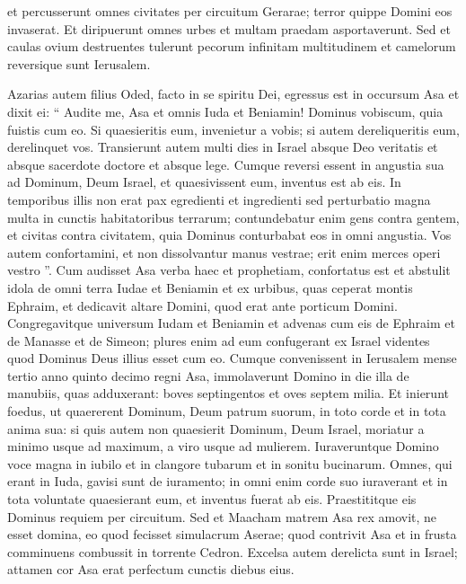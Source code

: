 \begin{biblechapter}
\begin{biblechapter}
\begin{biblechapter}
\begin{biblechapter}
\begin{biblechapter}
\begin{biblechapter}
\begin{biblechapter}
\begin{biblechapter}
\begin{biblechapter}
\begin{biblechapter}
\begin{biblechapter}
\begin{biblechapter}
\begin{biblechapter}
\begin{biblechapter}
\verse et percusserunt omnes civitates per circuitum Gerarae; terror quippe Domini eos invaserat. Et diripuerunt omnes urbes et multam praedam asportaverunt. 
\verse Sed et caulas ovium destruentes tulerunt pecorum infinitam multitudinem et camelorum reversique sunt Ierusalem.
 
\begin{biblechapter}
\verse Azarias autem filius Oded, facto in se spiritu Dei, 
\verse egressus est in occursum Asa et dixit ei: “ Audite me, Asa et omnis Iuda et Beniamin! Dominus vobiscum, quia fuistis cum eo. Si quaesieritis eum, invenietur a vobis; si autem dereliqueritis eum, derelinquet vos. 
\verse Transierunt autem multi dies in Israel absque Deo veritatis et absque sacerdote doctore et absque lege. 
\verse Cumque reversi essent in angustia sua ad Dominum, Deum Israel, et quaesivissent eum, inventus est ab eis. 
\verse In temporibus illis non erat pax egredienti et ingredienti sed perturbatio magna multa in cunctis habitatoribus terrarum; 
\verse contundebatur enim gens contra gentem, et civitas contra civitatem, quia Dominus conturbabat eos in omni angustia. 
\verse Vos autem confortamini, et non dissolvantur manus vestrae; erit enim merces operi vestro ”.
 \verse Cum audisset Asa verba haec et prophetiam, confortatus est et abstulit idola de omni terra Iudae et Beniamin et ex urbibus, quas ceperat montis Ephraim, et dedicavit altare Domini, quod erat ante porticum Domini. 
\verse Congregavitque universum Iudam et Beniamin et advenas cum eis de Ephraim et de Manasse et de Simeon; plures enim ad eum confugerant ex Israel videntes quod Dominus Deus illius esset cum eo.
 \verse Cumque convenissent in Ierusalem mense tertio anno quinto decimo regni Asa, 
\verse immolaverunt Domino in die illa de manubiis, quas adduxerant: boves septingentos et oves septem milia. 
\verse Et inierunt foedus, ut quaererent Dominum, Deum patrum suorum, in toto corde et in tota anima sua: 
\verse si quis autem non quaesierit Dominum, Deum Israel, moriatur a minimo usque ad maximum, a viro usque ad mulierem. 
\verse Iuraveruntque Domino voce magna in iubilo et in clangore tubarum et in sonitu bucinarum. 
\verse Omnes, qui erant in Iuda, gavisi sunt de iuramento; in omni enim corde suo iuraverant et in tota voluntate quaesierant eum, et inventus fuerat ab eis. Praestititque eis Dominus requiem per circuitum.
 \verse Sed et Maacham matrem Asa rex amovit, ne esset domina, eo quod fecisset simulacrum Aserae; quod contrivit Asa et in frusta comminuens combussit in torrente Cedron. 
\verse Excelsa autem derelicta sunt in Israel; attamen cor Asa erat perfectum cunctis diebus eius. 

\end{biblechapter}
\end{biblechapter}
\end{biblechapter}
\end{biblechapter}
\end{biblechapter}
\end{biblechapter}
\end{biblechapter}
\end{biblechapter}
\end{biblechapter}
\end{biblechapter}
\end{biblechapter}
\end{biblechapter}
\end{biblechapter}
\end{biblechapter}
\end{biblechapter}
